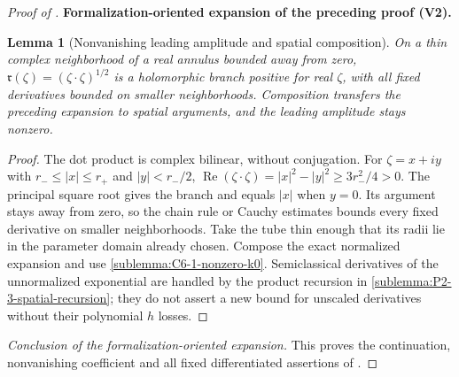 \documentclass[11pt]{article}
\newtheorem{lemma}[theorem]{Lemma}
\newcommand{\formalisationparentid}{X}
\newenvironment{formalisationaddition}[1]{\par\medskip\begingroup\color{blue}\def\formalisationparentid{#1}\setcounter{formalizationsublemma}{0}\let\lemma\formalizationsublemma\let\endlemma\endformalizationsublemma
  \def\Eo{\mathcal E_h^\circ}\def\EE{\mathcal E_h}\def\phio{\phi_h^\circ}\def\phih{\phi_h}\def\Ho{H_h^{\rm atom}(v^\circ)}\def\Ha{H_h^{\rm atom}}\def\HL{H_h^{L}}\def\Dh{D_h}\def\Log{\operatorname{Log}}\def\ellh{\ell_h}\def\Gp{G_{p,h}}\def\Ast{A_{*,h}}\def\ahat{\widehat{\mathfrak a}_h}\def\ah{\mathfrak a_h}\def\rh{\widehat\rho_h}\def\deltah{\widehat\delta_h}\def\oldref##1{\textup{(##1)}}\def\interface##1{\par\noindent\textit{Analytical interface used here.} ##1\par}\def\finish{\par\noindent\textit{Conclusion of the formalization-oriented expansion.} }\par\noindent\textbf{Formalization-oriented expansion of the preceding proof (V2).}\par\smallskip
}{\par\endgroup\medskip
}
\newcommand{\Rea}{\operatorname{Re}}
\begin{document}
\begin{proof}[Proof of ]
\begin{formalisationaddition}{C-T6.1}
\begin{lemma}[Nonvanishing leading amplitude and spatial composition]\label{sublemma:C6-1-spatial}
On a thin complex neighborhood of a real annulus bounded away from zero,
$\mathfrak r(\zeta)=(\zeta\cdot\zeta)^{1/2}$ is a holomorphic branch
positive for real $\zeta$, with all fixed derivatives bounded on smaller
neighborhoods. Composition transfers the preceding expansion to spatial
arguments, and the leading amplitude stays nonzero.
\end{lemma}
\begin{proof}
The dot product is complex bilinear, without conjugation. For
$\zeta=x+iy$ with $r_-\le|x|\le r_+$ and $|y|<r_-/2$,
$\Rea(\zeta\cdot\zeta)=|x|^2-|y|^2\ge3r_-^2/4>0$.
The principal square root gives the branch and equals $|x|$ when $y=0$.
Its argument stays away from zero, so the chain rule or Cauchy estimates
bounds every fixed derivative on smaller neighborhoods. Take the tube
thin enough that its radii lie in the parameter domain already chosen.
Compose the exact normalized expansion and use
\ref{sublemma:C6-1-nonzero-k0}. Semiclassical derivatives of the
unnormalized exponential are handled by the product recursion in
\ref{sublemma:P2-3-spatial-recursion}; they do not assert a new bound for
unscaled derivatives without their polynomial $h$ losses.
\end{proof}
\finish This proves the continuation, nonvanishing coefficient and all
fixed differentiated assertions of .
\end{formalisationaddition}

\end{proof}
\end{document}
